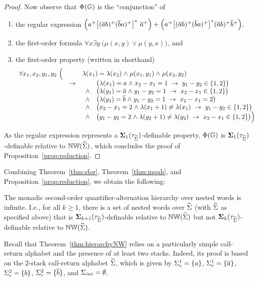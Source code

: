 \documentclass{LMCS}
\begin{document}
\begin{proof}
Now observe that $\Phi(\mathbb{G})$ is the ``conjunction'' of
\begin{enumerate}[$\bullet$]\itemsep=1.2ex
\item the regular expression
  $
  \Bigl(a^+ \bigl[(\overline{a} b)^+ (\overline{b}
  a)^+\bigr]^{\ast~}\overline{a}^+\Bigr) + \Bigl(a^+ \bigl[(\overline{a} b)^+
  (\overline{b} a)^+\bigr]^\ast (\overline{a} b)^+
  \overline{b}~\!\!^+\Bigr),$
\item the first-order formula $\forall x \exists y~\bigl(\mu(x,y)
  \mathrel{\vee} \mu(y,x)\bigr),~\text{and}$
\item the first-order property (written in shorthand)
\[\begin{array}{rrl} \forall x_1,x_2,y_1,y_2~ \Bigl( & & \lambda(x_1) =
  \lambda(x_2) \mathrel{\wedge} \mu(x_1,y_1) \mathrel{\wedge} \mu(x_2,y_2)\\
  & \rightarrow &
\begin{array}[t]{rl}
  &  \bigl(\lambda(x_1) = a \mathrel{\wedge} x_2 - x_1 = 1 ~\mathrel{\rightarrow}~ y_1 - y_2 \in \{1,2\} \bigr)\\
  \wedge &  \bigl(\lambda(y_1) = \overline{a} \mathrel{\wedge} y_1 - y_2 = 1
  ~\mathrel{\rightarrow}~ x_2 - x_1 \in \{1,2\} \bigr)\\
  \wedge &  \bigl(\lambda(y_1) = \overline{b} \mathrel{\wedge} y_1 - y_2 = 1
  ~\mathrel{\rightarrow}~ x_2 - x_1 = 2 \bigr)\\
  \wedge &  \bigl(x_2 - x_1 = 2 \mathrel{\wedge} \lambda(x_1 + 1) \neq \lambda(x_1)
  ~\mathrel{\rightarrow}~ y_1 - y_2 \in \{1,2\} \bigr)\\
  \wedge &  \bigl(y_1 - y_2 = 2 \mathrel{\wedge} \lambda(y_2 + 1) \neq \lambda(y_2)
  ~\mathrel{\rightarrow}~ x_2 - x_1 \in \{1,2\} \bigr)\Bigr)
\end{array}
\end{array}\]
\end{enumerate}
As the regular expression represents a ${\bf{\Sigma}}_1(\tau_{\widetilde{\Sigma}})$-definable
property, $\Phi(\mathbb{G})$ is ${\bf{\Sigma}}_1(\tau_{\widetilde{\Sigma}})$-definable relative to
$\mathbb{NW}(\widetilde{\Sigma})$, which concludes the proof of
Proposition~\ref{prop:reduction}.
\end{proof}

Combining Theorem~\ref{thm:sfor}, Theorem~\ref{thm:mqah}, and
Proposition~\ref{prop:reduction}, we obtain the following:

\begin{thm}\label{thm:hierarchyNW}
  $\!$The monadic second-order quantifier-alternation hierarchy over nested words
  is infinite. I.e., for all $k \ge 1$, there is a set of nested words over
  $\widetilde{\Sigma}$ (with $\widetilde{\Sigma}$ as specified above) that is
  ${\bf{\Sigma}}_{k+1}(\tau_{\widetilde{\Sigma}})$-definable relative to $\mathbb{NW}(\widetilde{\Sigma})$ but not
  ${\bf{\Sigma}}_{k}(\tau_{\widetilde{\Sigma}})$-definable relative to $\mathbb{NW}(\widetilde{\Sigma})$.
\end{thm}
Recall that Theorem~\ref{thm:hierarchyNW} relies on a particularly simple
call-return alphabet and the presence of at least two stacks. Indeed, its
proof is based on the $2$-stack call-return alphabet $\widetilde{\Sigma}$, which is
given by $\Sigma_c^1=\{a\}$, $\Sigma_r^1=\{\overline{a}\}$, $\Sigma_c^2=\{b\}$,
$\Sigma_r^2=\{\overline{b}\}$, and $\Sigma_{\mathit{int}} = \emptyset$.
\end{document}

